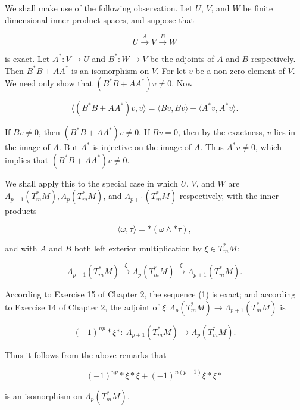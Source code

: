 \begin{remarks}\label{thm:6.34}
We shall make use of the following observation. Let $U$, $V$, and $W$ be finite dimensional inner product spaces, and suppose that

\[
U \xrightarrow{A} V \xrightarrow{B} W
\]

is exact. Let $A^{*}\colon V\to U$ and $B^{*}\colon W\to V$ be the adjoints of $A$ and $B$ respectively. Then $B^{*}B+AA^{*}$ is an isomorphism on $V$. For let $v$ be a non-zero element of $V$. We need only show that $(B^{*}B+AA^{*})v\neq0$. Now

\[
\langle(B^{*}B+A A^{*})v,v\rangle=\langle B v,B v\rangle+\langle A^{*}v,A^{*}v\rangle.
\]

If $Bv \neq 0$, then $(B^*B + AA^*)v \neq 0$. If $Bv = 0$, then by the exactness, $v$ lies in the image of $A$. But $A^*$ is injective on the image of $A$. Thus $A^*v \neq 0$, which implies that $(B^*B + AA^*)v \neq 0$.

We shall apply this to the special case in which $U$, $V$, and $W$ are $\Lambda_{p-1}(T_{m}^{*} M), \Lambda_{p}(T_{m}^{*} M)$, and $\Lambda_{p+1}(T_{m}^{*} M)$ respectively, with the inner products

\[
\langle\omega,\tau\rangle=\ast(\omega\wedge\ast\tau),
\]

and with $A$ and $B$ both left exterior multiplication by $\xi \in T_{m}^{*} M$:

\begin{equation}
\tag{1}\label{eq:6.34:1}
\Lambda_{p-1}(T_{m}^{*} M)\xrightarrow{\xi}\Lambda_{p}(T_{m}^{*} M)\xrightarrow{\xi}\Lambda_{p+1}(T_{m}^{*} M).
\end{equation}

According to Exercise 15 of Chapter 2, the sequence (1) is exact; and according to Exercise 14 of Chapter 2, the adjoint of  $ \xi\colon \Lambda_{p}(T_{m}^{*} M)\to\Lambda_{p+1}(T_{m}^{*} M) $ is

\begin{equation}
\tag{2}\label{eq:6.34:2}
(-1)^{n p}*{\xi}*:\:\Lambda_{p+1}(T_{m}^{*} M)\to\Lambda_{p}(T_{m}^{*} M).
\end{equation}

Thus it follows from the above remarks that

\begin{equation}
\tag{3}\label{eq:6.34:3}
(-1)^{n p}{*}\xi{*}\xi+(-1)^{n(p-1)}\xi{*}\xi{*}
\end{equation}

is an isomorphism on $\Lambda_{p}(T_{m}^{*} M)$.

\end{remarks}

